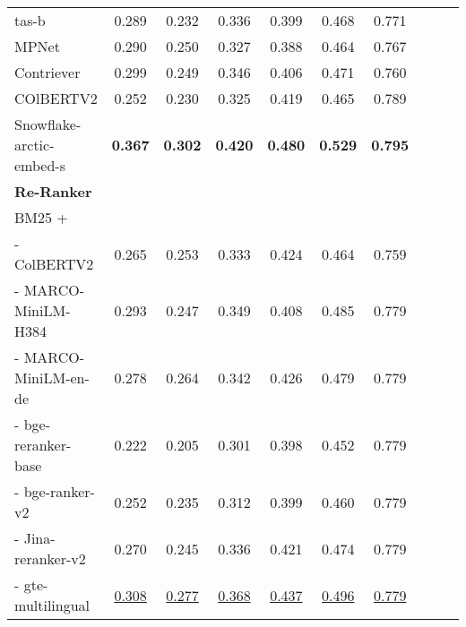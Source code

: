\begin{table*}[!ht]
\begin{tabular}{lccccccccc}
                        tas-b \cite{tas-b} & 0.289 & 0.232 & 0.336 & 0.399 & 0.468 & 0.771 \\
                        MPNet \cite{mpnet} & 0.290 & 0.250 & 0.327& 0.388 & 0.464& 0.767 \\
       Contriever \cite{contriever} & 0.299& 0.249 & 0.346 & 0.406 & 0.471 & 0.760\\
    COlBERTV2 \cite{santhanam-etal-2022-colbertv2} & 0.252 &  0.230 & 0.325 & 0.419 & 0.465 & 0.789  \\
    Snowflake-arctic-embed-s \cite{merrick2024embeddingclusteringdataimprove} & \textbf{0.367} \up{27.43} & \textbf{0.302} \up{19.37} & \textbf{0.420} \up{21.74} & \textbf{0.480} \up{14.01} & \textbf{0.529} \up{11.37} & \textbf{0.795} \up{2.05} \\
\midrule
\textbf{Re-Ranker} \\
BM25 + & \\
 - ColBERTV2 &0.265 & 0.253 &  0.333 & 0.424 & 0.464 & 0.759 \\
- MARCO-MiniLM-H384 & 0.293 & 0.247     & 0.349 & 0.408 & 0.485 & 0.779\\

 - MARCO-MiniLM-en-de & 0.278 & 0.264 & 0.342 & 0.426 & 0.479  & 0.779 \\
- bge-reranker-base & 0.222 & 0.205 & 0.301 & 0.398 & 0.452 & 0.779\\
- bge-ranker-v2 & 0.252 & 0.235 & 0.312 & 0.399 & 0.460 & 0.779 \\
- Jina-reranker-v2 & 0.270 & 0.245 & 0.336 & 0.421 & 0.474 & 0.779\\
- gte-multilingual & \underline{0.308} \up{6.04}& \underline{0.277} \up{9.49} & \underline{0.368} \up{6.67} & \underline{0.437} \up{3.80}& \underline{0.496} \up{4.42} & \underline{0.779} \\



\end{tabular}
\end{table*}
